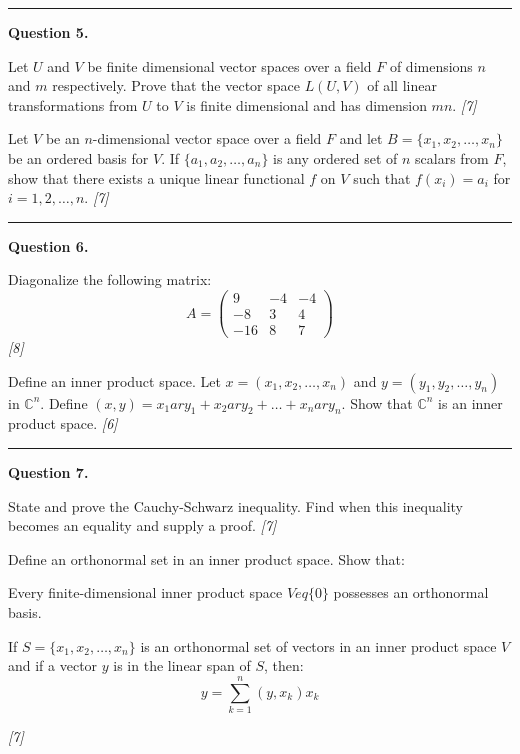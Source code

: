 \documentclass[11pt,a4paper]{article}
\newcommand{\pts}[1]{\hfill   \textit{[#1]}}
\begin{document}
\medskip\rule{\linewidth}{0.2pt}

\medskip


\noindent   \textbf{Question 5.}

\begin{parts}
  \item Let $U$ and $V$ be finite dimensional vector spaces over a field $F$ of dimensions $n$ and $m$ respectively. Prove that the vector space $L(U, V)$ of all linear transformations from $U$ to $V$ is finite dimensional and has dimension $mn$. \pts{7}
  \item Let $V$ be an $n$-dimensional vector space over a field $F$ and let $B = \{x_1, x_2, \dots, x_n\}$ be an ordered basis for $V$. If $\{a_1, a_2, \dots, a_n\}$ is any ordered set of $n$ scalars from $F$, show that there exists a unique linear functional $f$ on $V$ such that $f(x_i) = a_i$ for $i = 1, 2, \dots, n$. \pts{7}
\end{parts}

\medskip\rule{\linewidth}{0.2pt}

\medskip


\noindent   \textbf{Question 6.}

\begin{parts}
  \item Diagonalize the following matrix:
  \[
  A = 
\begin{pmatrix} 9 & -4 & -4 \\ -8 & 3 & 4 \\ -16 & 8 & 7 \end{pmatrix}
  \] \pts{8}
  \item Define an inner product space. Let $x = (x_1, x_2, \dots, x_n)$ and $y = (y_1, y_2, \dots, y_n)$ in $\mathbb{C}^n$. Define $(x, y) = x_1 ar{y}_1 + x_2 ar{y}_2 + \dots + x_n ar{y}_n$. Show that $\mathbb{C}^n$ is an inner product space. \pts{6}
\end{parts}

\medskip\rule{\linewidth}{0.2pt}

\medskip


\noindent   \textbf{Question 7.}

\begin{parts}
  \item State and prove the Cauchy-Schwarz inequality. Find when this inequality becomes an equality and supply a proof. \pts{7}
  \item Define an orthonormal set in an inner product space. Show that:
  
\begin{parts}
    \item Every finite-dimensional inner product space $V 
eq \{0\}$ possesses an orthonormal basis.
    \item If $S = \{x_1, x_2, \dots, x_n\}$ is an orthonormal set of vectors in an inner product space $V$ and if a vector $y$ is in the linear span of $S$, then:
    \[
    y = \sum_{k=1}^n (y, x_k) x_k
    \]
  \end{parts} \pts{7}
\end{parts}
\end{document}
